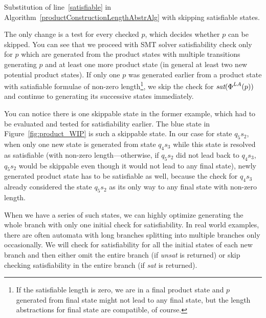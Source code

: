 \begin{algorithm}
    \caption{Substitution of line~\ref{satisfiable} in Algorithm~\ref{productConstructionLengthAbstrAlg} with skipping satisfiable states.} \label{productConstructionLengthAbstrAlgSkip}
    \DontPrintSemicolon
\end{algorithm}

The only change is a test for every checked $p$, which decides whether $p$ can be skipped. You can see that we proceed with SMT solver satisfiability check only for $p$ which are generated from the product states with multiple transitions generating $p$ and at least one more product state (in general at least two new potential product states). If only one $p$ was generated earlier from a product state with satiafiable formulae of non-zero length\footnote{If the satisfiable length is zero, we are in a final product state and $p$ generated from final state might not lead to any final state, but the length abstractions for final state are compatible, of course.}, we skip the check for $\emph{sat}(\emph{$\Phi$}^{LA}(p))$ and continue to generating its successive states immediately.

You can notice there is one skippable state in the former example, which had to be evaluated and tested for satisfiability earlier. The blue state in Figure~\ref{fig:product_WIP} is such a skippable state. In our case for state $q_5s_2$, when only one new state is generated from state $q_4s_3$ while this state is resolved as satisfiable (with non-zero length---otherwise, if $q_5s_2$ did not lead back to $q_4s_3$, $q_5s_2$ would be skippable even though it would not lead to any final state), newly generated product state has to be satisfiable as well, because the check for $q_4s_3$ already considered the state $q_5s_2$ as its only way to any final state with non-zero length.

When we have a series of such states, we can highly optimize generating the whole branch with only one initial check for satisfiability. In real world examples, there are often automata with long branches splitting into multiple branches only occasionally. We will check for satisfiability for all the initial states of each new branch and then either omit the entire branch (if \emph{unsat} is returned) or skip checking satisfiability in the entire branch (if \emph{sat} is returned).


